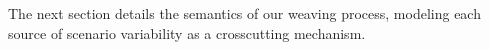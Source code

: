 \documentclass{sig-alternate}
\begin{document}
The next section details the semantics of our
weaving process, modeling each source of scenario variability as a crosscutting 
mechanism.


% 
% 
% 
% 
% 


\end{document}
